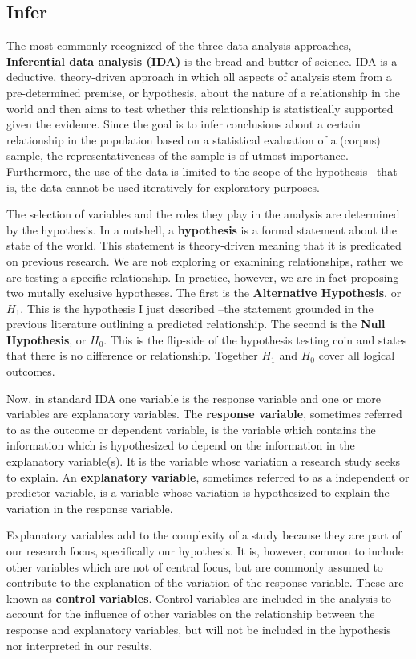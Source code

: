 \documentclass[
  letterpaper,
]{latex/krantz}
\theoremstyle{definition}
\theoremstyle{remark}
\begin{document}
\subsection{Infer}\label{sec-aa-infer}

The most commonly recognized of the three data analysis approaches,
\textbf{Inferential data analysis (IDA)} is the bread-and-butter of
science. IDA is a deductive, theory-driven approach in which all aspects
of analysis stem from a pre-determined premise, or hypothesis, about the
nature of a relationship in the world and then aims to test whether this
relationship is statistically supported given the evidence. Since the
goal is to infer conclusions about a certain relationship in the
population based on a statistical evaluation of a (corpus) sample, the
representativeness of the sample is of utmost importance. Furthermore,
the use of the data is limited to the scope of the hypothesis --that is,
the data cannot be used iteratively for exploratory purposes.

The selection of variables and the roles they play in the analysis are
determined by the hypothesis. In a nutshell, a \textbf{hypothesis} is a
formal statement about the state of the world. This statement is
theory-driven meaning that it is predicated on previous research. We are
not exploring or examining relationships, rather we are testing a
specific relationship. In practice, however, we are in fact proposing
two mutally exclusive hypotheses. The first is the \textbf{Alternative
Hypothesis}, or \(H_1\). This is the hypothesis I just described --the
statement grounded in the previous literature outlining a predicted
relationship. The second is the \textbf{Null Hypothesis}, or \(H_0\).
This is the flip-side of the hypothesis testing coin and states that
there is no difference or relationship. Together \(H_1\) and \(H_0\)
cover all logical outcomes.

Now, in standard IDA one variable is the response variable and one or
more variables are explanatory variables. The \textbf{response
variable}, sometimes referred to as the outcome or dependent variable,
is the variable which contains the information which is hypothesized to
depend on the information in the explanatory variable(s). It is the
variable whose variation a research study seeks to explain. An
\textbf{explanatory variable}, sometimes referred to as a independent or
predictor variable, is a variable whose variation is hypothesized to
explain the variation in the response variable.

Explanatory variables add to the complexity of a study because they are
part of our research focus, specifically our hypothesis. It is, however,
common to include other variables which are not of central focus, but
are commonly assumed to contribute to the explanation of the variation
of the response variable. These are known as \textbf{control variables}.
Control variables are included in the analysis to account for the
influence of other variables on the relationship between the response
and explanatory variables, but will not be included in the hypothesis
nor interpreted in our results.
\end{document}
